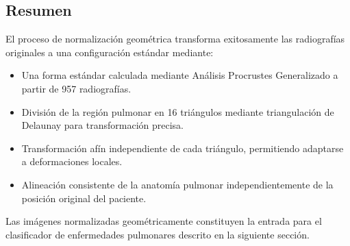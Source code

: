 \subsection{Resumen}
\label{subsec:resumen_normalizacion}

El proceso de normalización geométrica transforma exitosamente las radiografías originales a una configuración estándar mediante:

\begin{itemize}
    \item Una forma estándar calculada mediante Análisis Procrustes Generalizado a partir de 957 radiografías.
    \item División de la región pulmonar en 16 triángulos mediante triangulación de Delaunay para transformación precisa.
    \item Transformación afín independiente de cada triángulo, permitiendo adaptarse a deformaciones locales.
    \item Alineación consistente de la anatomía pulmonar independientemente de la posición original del paciente.
\end{itemize}

Las imágenes normalizadas geométricamente constituyen la entrada para el clasificador de enfermedades pulmonares descrito en la siguiente sección.

